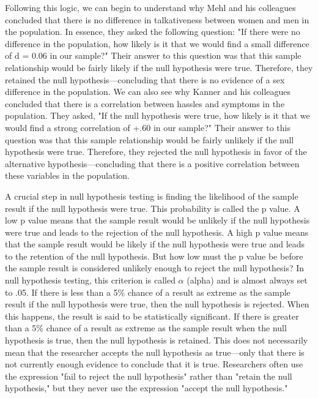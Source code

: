 Following this logic, we can begin to understand why Mehl and his colleagues concluded that there is no difference in talkativeness between women and men in the population. In essence, they asked the following question: "If there were no difference in the population, how likely is it that we would find a small difference of d = 0.06 in our sample?" Their answer to this question was that this sample relationship would be fairly likely if the null hypothesis were true. Therefore, they retained the null hypothesis---concluding that there is no evidence of a sex difference in the population. We can also see why Kanner and his colleagues concluded that there is a correlation between hassles and symptoms in the population. They asked, "If the null hypothesis were true, how likely is it that we would find a strong correlation of +.60 in our sample?" Their answer to this question was that this sample relationship would be fairly unlikely if the null hypothesis were true. Therefore, they rejected the null hypothesis in favor of the alternative hypothesis---concluding that there is a positive correlation between these variables in the population.


A crucial step in null hypothesis testing is finding the likelihood of the sample result if the null hypothesis were true. This probability is called the p value. A low p value means that the sample result would be unlikely if the null hypothesis were true and leads to the rejection of the null hypothesis. A high p value means that the sample result would be likely if the null hypothesis were true and leads to the retention of the null hypothesis. But how low must the p value be before the sample result is considered unlikely enough to reject the null hypothesis? In null hypothesis testing, this criterion is called $\alpha$ (alpha) and is almost always set to .05. If there is less than a 5\% chance of a result as extreme as the sample result if the null hypothesis were true, then the null hypothesis is rejected. When this happens, the result is said to be statistically significant. If there is greater than a 5\% chance of a result as extreme as the sample result when the null hypothesis is true, then the null hypothesis is retained. This does not necessarily mean that the researcher accepts the null hypothesis as true---only that there is not currently enough evidence to conclude that it is true. Researchers often use the expression "fail to reject the null hypothesis" rather than "retain the null hypothesis," but they never use the expression "accept the null hypothesis."



